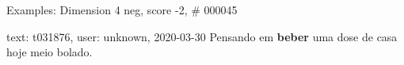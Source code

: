 \begin{frame}{Examples: Dimension 4 neg, score -2, \# 000045}
\footnotesize
\begin{alertblock}{text: t031876, user: unknown, 2020-03-30}
Pensando em \textbf{beber} uma dose de casa hoje meio bolado. 
 \textbf{} 
\end{alertblock}
\end{frame}
